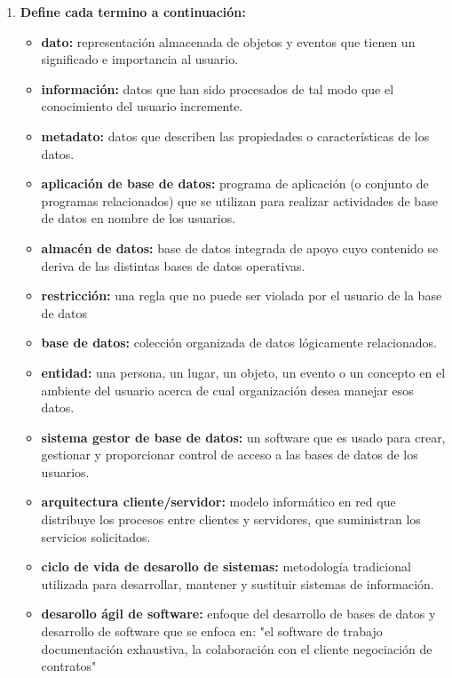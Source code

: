 \documentclass[letterpaper,12pt]{article}
\begin{document}
\begin{sloppypar}
\begin{itemize}
    \begin{enumerate}
        \item \textbf{Define cada termino a continuación:} 
        \begin{itemize}
            \item \textbf{dato:} representación almacenada de objetos y eventos que tienen un significado e importancia al usuario.
            \item \textbf{información:} datos que han sido procesados de tal modo que el conocimiento del usuario incremente.
            \item \textbf{metadato:} datos que describen las propiedades o características de los datos.
            \item \textbf{aplicación de base de datos:} programa de aplicación (o conjunto de programas relacionados) que se utilizan para realizar actividades de base de datos en nombre de los usuarios.
            \item \textbf{almacén de datos:} base de datos integrada de apoyo cuyo contenido se deriva
            de las distintas bases de datos
            operativas.
            \item \textbf{restricción: }una regla que no puede ser violada por el usuario de la base de datos
            \item \textbf{base de datos:} colección organizada de datos
            lógicamente relacionados.
            \item \textbf{entidad: }una persona, un lugar, un objeto, un evento o un concepto en el ambiente del usuario acerca de cual organización desea manejar esos datos.
            \item \textbf{sistema gestor de base de datos:} un software que es usado para crear, gestionar y proporcionar control de acceso a las bases de datos de los usuarios.
            \item \textbf{arquitectura cliente/servidor:} modelo informático en red que distribuye los procesos entre clientes y servidores, que suministran
            los servicios solicitados. 
            \item \textbf{ciclo de vida de desarollo de sistemas: }metodología tradicional utilizada para desarrollar, mantener y sustituir sistemas de información.
            \item \textbf{desarollo ágil de software:} enfoque del desarrollo de bases de datos y desarrollo de software que se enfoca en: "el software de trabajo
            documentación exhaustiva, la colaboración con el cliente negociación de contratos"

\end{itemize}
\end{enumerate}
\end{itemize}
\end{sloppypar}
\end{document}

